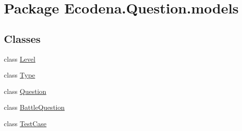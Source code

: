 \hypertarget{namespace_ecodena_1_1_question_1_1models}{
\section{Package Ecodena.Question.models}
\label{d3/d3a/namespace_ecodena_1_1_question_1_1models}
}
\subsection*{Classes}
\begin{DoxyCompactItemize}
\item 
class \hyperlink{class_ecodena_1_1_question_1_1models_1_1_level}{Level}
\item 
class \hyperlink{class_ecodena_1_1_question_1_1models_1_1_type}{Type}
\item 
class \hyperlink{class_ecodena_1_1_question_1_1models_1_1_question}{Question}
\item 
class \hyperlink{class_ecodena_1_1_question_1_1models_1_1_battle_question}{BattleQuestion}
\item 
class \hyperlink{class_ecodena_1_1_question_1_1models_1_1_test_case}{TestCase}
\end{DoxyCompactItemize}
